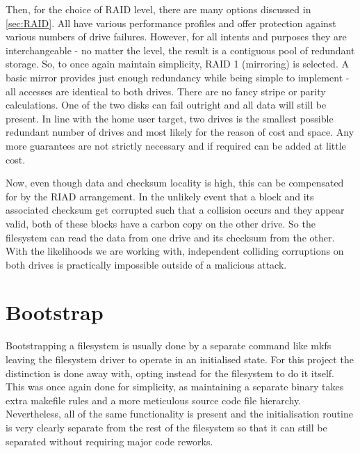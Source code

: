         Then, for the choice of RAID level, there are many options discussed in
        \autoref{sec:RAID}. All have various performance profiles and offer
        protection against various numbers of drive failures. However, for all
        intents and purposes they are interchangeable - no matter the level, the
        result is a contiguous pool of redundant storage. So, to once again
        maintain simplicity, RAID 1 (mirroring) is selected. A basic mirror
        provides just enough redundancy while being simple to implement - all
        accesses are identical to both drives. There are no fancy stripe or
        parity calculations. One of the two disks can fail outright and all
        data will still be present. In line with the home user target, two
        drives is the smallest possible redundant number of drives and most
        likely for the reason of cost and space. Any more guarantees are not
        strictly necessary and if required can be added at little cost.

        Now, even though data and checksum locality is high, this can be
        compensated for by the RIAD arrangement. In the unlikely event that a
        block and its associated checksum get corrupted such that a collision
        occurs and they appear valid, both of these blocks have a carbon copy
        on the other drive. So the filesystem can read the data from one drive
        and its checksum from the other. With the likelihoods we are working
        with, independent colliding corruptions on both drives is practically
        impossible outside of a malicious attack.

    \section{Bootstrap}

        Bootstrapping a filesystem is usually done by a separate command like
        mkfs \cite{man_mkfs} leaving the filesystem driver to operate in an
        initialised state. For this project the distinction is done away with,
        opting instead for the filesystem to do it itself. This was once again
        done for simplicity, as maintaining a separate binary takes extra
        makefile rules and a more meticulous source code file hierarchy.
        Nevertheless, all of the same functionality is present and the
        initialisation routine is very clearly separate from the rest of the
        filesystem so that it can still be separated without requiring major
        code reworks.


